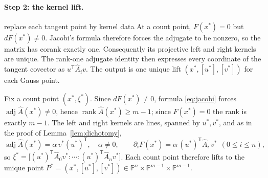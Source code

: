 \documentclass[acmsmall,screen,nonacm]{acmart}
\theoremstyle{definition}
\theoremstyle{remark}
\DeclareMathOperator{\rank}{rank}
\DeclareMathOperator{\adj}{adj}
\newcommand{\PP}{\mathbb{P}}
\begin{document}
\paragraph{Step 2: the kernel lift.}
\begin{roadmapbox}{replace each tangent point by kernel data}
At a count point, $F(x^*)=0$ but $dF(x^*)\ne0$.  Jacobi's formula therefore
forces the adjugate to be nonzero, so the matrix has corank exactly one.
Consequently its projective left and right kernels are unique.  The rank-one
adjugate identity then expresses every coordinate of the tangent covector as
$u^{\mathsf T}\widehat A_i v$.  The output is one unique lift
$(x^*,[u^*],[v^*])$ for each Gauss point.
\end{roadmapbox}
Fix a count point $(x^*,\xi^*)$.  Since $dF(x^*)\ne0$, formula
\eqref{eq:jacobi} forces $\adj\widehat A(x^*)\ne0$, hence
$\rank\widehat A(x^*)\ge m-1$; since $F(x^*)=0$ the rank is exactly
$m-1$.  The left and right kernels are lines, spanned by $u^*,v^*$,
and as in the proof of Lemma~\ref{lem:dichotomy},
\begin{equation}\label{eq:conormalid}
  \adj\widehat A(x^*)=\alpha\,v^*(u^*)^{\mathsf T},\quad\alpha\ne0,
  \qquad
  \partial_iF(x^*)=\alpha\,(u^*)^{\mathsf T}\widehat A_i\,v^*\ \
  (0\le i\le n),
\end{equation}
so $\xi^*=\big[(u^*)^{\mathsf T}\widehat A_0v^*:\cdots:
(u^*)^{\mathsf T}\widehat A_nv^*\big]$.  Each count point therefore
lifts to the unique point
$P^*=(x^*,[u^*],[v^*])\in\PP^n\times\PP^{m-1}\times\PP^{m-1}$.
\end{document}
